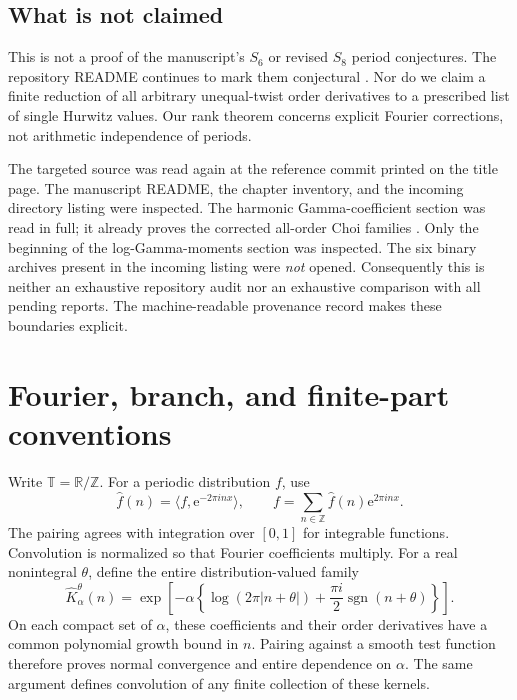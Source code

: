 \documentclass[11pt,letterpaper]{article}
\numberwithin{equation}{section}
\theoremstyle{definition}
\theoremstyle{remark}
\newcommand{\bcsgn}{\operatorname{sgn}}
\newcommand{\bcT}{\mathbb T}
\newcommand{\bcR}{\mathbb R}
\newcommand{\bce}{\mathrm e}
\begin{document}
\subsection{What is not claimed}

This is not a proof of the manuscript's $S_6$ or revised $S_8$ period
conjectures. The repository README continues to mark them conjectural
\cite{repo-readme}. Nor do we claim a finite reduction of all arbitrary
unequal-twist order derivatives to a prescribed list of single Hurwitz
values. Our rank theorem concerns explicit Fourier corrections, not
arithmetic independence of periods.

The targeted source was read again at the reference commit printed on
the title page. The manuscript README, the chapter inventory, and the
incoming directory listing were inspected. The harmonic Gamma-coefficient
section was read in full; it already proves the corrected all-order Choi
families \cite{repo-harmonic}. Only the beginning of the log-Gamma-moments
section was inspected. The six binary archives present in the incoming
listing were \emph{not} opened. Consequently this is neither an exhaustive
repository audit nor an exhaustive comparison with all pending reports.
The machine-readable provenance record makes these boundaries explicit.

\section{Fourier, branch, and finite-part conventions}
\label{bc:sec:conventions}

Write $\bcT=\bcR/\mathbb Z$. For a periodic distribution $f$, use
\[
 \widehat f(n)=\langle f,\bce^{-2\pi i n x}\rangle,
 \qquad f=\sum_{n\in\mathbb Z}\widehat f(n)\bce^{2\pi i n x}.
\]
The pairing agrees with integration over $[0,1]$ for integrable functions.
Convolution is normalized so that Fourier coefficients multiply. For a
real nonintegral $\theta$, define the entire distribution-valued family
\begin{equation}\label{bc:eq:kernel}
 \widehat K_\alpha^\theta(n)
  =\exp\left[-\alpha\left\{
       \log(2\pi|n+\theta|)
       +\frac{\pi i}{2}\bcsgn(n+\theta)\right\}\right].
\end{equation}
On each compact set of $\alpha$, these coefficients and their order
derivatives have a common polynomial growth bound in $n$. Pairing against
a smooth test function therefore proves normal convergence and entire
dependence on $\alpha$. The same argument defines convolution of any
finite collection of these kernels.
\end{document}
